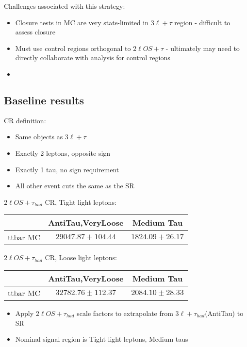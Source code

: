 \documentclass[11pt]{article}
\begin{document}
		Challenges associated with this strategy: 
		\begin{itemize} 
			\item Closure tests in MC are very stats-limited in $3\ell+\tau$ region - difficult to assess closure 
			\item Must use control regions orthogonal to $2\ell OS+\tau$ - ultimately may need to directly collaborate with analysis for control regions
			\item 
		\end{itemize} 

		\clearpage
		\subsection{Baseline results} 
		CR definition: 
		\begin{itemize} 
			\item Same objects as $3\ell+\tau$
			\item Exactly 2 leptons, opposite sign 
			\item Exactly 1 tau, no sign requirement 
			\item All other event cuts the same as the SR
		\end{itemize} 

		$2\ell OS+\tau_{had}$ CR, Tight light leptons: 
	\begin{table}[h!]
		\begin{tabular}{|c|c|c|}
			\hline 
			  & AntiTau,VeryLoose & Medium Tau \\
			 \hline
			 ttbar MC & $29047.87 \pm 104.44$   & $1824.09 \pm 26.17$     \\
			\hline 
		\end{tabular}
	\end{table}%

		$2\ell OS+\tau_{had}$ CR, Loose light leptons:
	\begin{table}[h!]
		\begin{tabular}{|c|c|c|}
			\hline 
			  & AntiTau,VeryLoose & Medium Tau \\
			 \hline
			 ttbar MC & $32782.76 \pm 112.37$        & $2084.10 \pm 28.33$     \\
			\hline 
		\end{tabular}
	\end{table}%

			\begin{itemize}
		\item Apply $2\ell OS+\tau_{had}$ scale factors to extrapolate from $3\ell+\tau_{had}$(AntiTau) to SR 
		\item Nominal signal region is Tight light leptons, Medium taus 
	\end{itemize}
	
\end{document}
